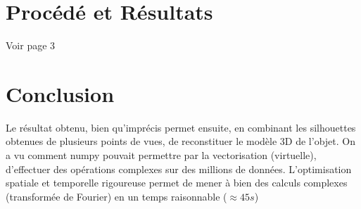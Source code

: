\documentclass{article}
\begin{document}
\begin{multicols}{2}
\section{Procédé et Résultats}

Voir page 3 \;\;\; 

\section{Conclusion}
	Le résultat obtenu, bien qu'imprécis permet ensuite, en combinant les silhouettes obtenues de plusieurs points de vues, de reconstituer le modèle 3D de l'objet. On a vu comment numpy pouvait permettre par la vectorisation (virtuelle), d'effectuer des opérations complexes sur des millions de données. L'optimisation spatiale et temporelle rigoureuse permet de mener à bien des calculs complexes (transformée de Fourier) en un temps raisonnable ($\approx 45s$)

\end{multicols}
\end{document}
